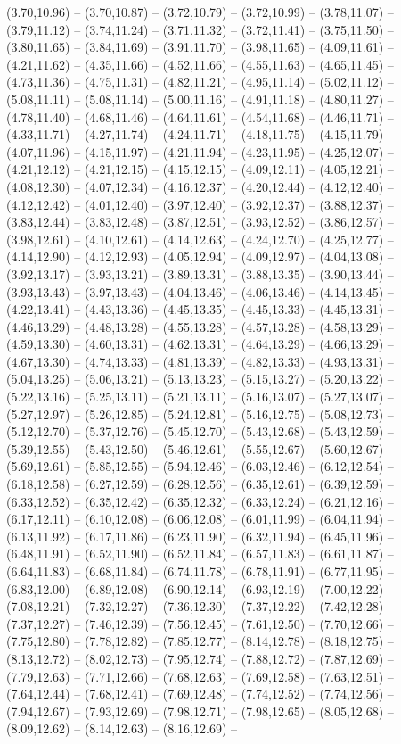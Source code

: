 {(3.70,10.96) -- (3.70,10.87) -- (3.72,10.79) -- (3.72,10.99) -- (3.78,11.07) -- (3.79,11.12) -- (3.74,11.24) -- (3.71,11.32) -- (3.72,11.41) -- (3.75,11.50) -- (3.80,11.65) -- (3.84,11.69) -- (3.91,11.70) -- (3.98,11.65) -- (4.09,11.61) -- (4.21,11.62) -- (4.35,11.66) -- (4.52,11.66) -- (4.55,11.63) -- (4.65,11.45) -- (4.73,11.36) -- (4.75,11.31) -- (4.82,11.21) -- (4.95,11.14) -- (5.02,11.12) -- (5.08,11.11) -- (5.08,11.14) -- (5.00,11.16) -- (4.91,11.18) -- (4.80,11.27) -- (4.78,11.40) -- (4.68,11.46) -- (4.64,11.61) -- (4.54,11.68) -- (4.46,11.71) -- (4.33,11.71) -- (4.27,11.74) -- (4.24,11.71) -- (4.18,11.75) -- (4.15,11.79) -- (4.07,11.96) -- (4.15,11.97) -- (4.21,11.94) -- (4.23,11.95) -- (4.25,12.07) -- (4.21,12.12) -- (4.21,12.15) -- (4.15,12.15) -- (4.09,12.11) -- (4.05,12.21) -- (4.08,12.30) -- (4.07,12.34) -- (4.16,12.37) -- (4.20,12.44) -- (4.12,12.40) -- (4.12,12.42) -- (4.01,12.40) -- (3.97,12.40) -- (3.92,12.37) -- (3.88,12.37) -- (3.83,12.44) -- (3.83,12.48) -- (3.87,12.51) -- (3.93,12.52) -- (3.86,12.57) -- (3.98,12.61) -- (4.10,12.61) -- (4.14,12.63) -- (4.24,12.70) -- (4.25,12.77) -- (4.14,12.90) -- (4.12,12.93) -- (4.05,12.94) -- (4.09,12.97) -- (4.04,13.08) -- (3.92,13.17) -- (3.93,13.21) -- (3.89,13.31) -- (3.88,13.35) -- (3.90,13.44) -- (3.93,13.43) -- (3.97,13.43) -- (4.04,13.46) -- (4.06,13.46) -- (4.14,13.45) -- (4.22,13.41) -- (4.43,13.36) -- (4.45,13.35) -- (4.45,13.33) -- (4.45,13.31) -- (4.46,13.29) -- (4.48,13.28) -- (4.55,13.28) -- (4.57,13.28) -- (4.58,13.29) -- (4.59,13.30) -- (4.60,13.31) -- (4.62,13.31) -- (4.64,13.29) -- (4.66,13.29) -- (4.67,13.30) -- (4.74,13.33) -- (4.81,13.39) -- (4.82,13.33) -- (4.93,13.31) -- (5.04,13.25) -- (5.06,13.21) -- (5.13,13.23) -- (5.15,13.27) -- (5.20,13.22) -- (5.22,13.16) -- (5.25,13.11) -- (5.21,13.11) -- (5.16,13.07) -- (5.27,13.07) -- (5.27,12.97) -- (5.26,12.85) -- (5.24,12.81) -- (5.16,12.75) -- (5.08,12.73) -- (5.12,12.70) -- (5.37,12.76) -- (5.45,12.70) -- (5.43,12.68) -- (5.43,12.59) -- (5.39,12.55) -- (5.43,12.50) -- (5.46,12.61) -- (5.55,12.67) -- (5.60,12.67) -- (5.69,12.61) -- (5.85,12.55) -- (5.94,12.46) -- (6.03,12.46) -- (6.12,12.54) -- (6.18,12.58) -- (6.27,12.59) -- (6.28,12.56) -- (6.35,12.61) -- (6.39,12.59) -- (6.33,12.52) -- (6.35,12.42) -- (6.35,12.32) -- (6.33,12.24) -- (6.21,12.16) -- (6.17,12.11) -- (6.10,12.08) -- (6.06,12.08) -- (6.01,11.99) -- (6.04,11.94) -- (6.13,11.92) -- (6.17,11.86) -- (6.23,11.90) -- (6.32,11.94) -- (6.45,11.96) -- (6.48,11.91) -- (6.52,11.90) -- (6.52,11.84) -- (6.57,11.83) -- (6.61,11.87) -- (6.64,11.83) -- (6.68,11.84) -- (6.74,11.78) -- (6.78,11.91) -- (6.77,11.95) -- (6.83,12.00) -- (6.89,12.08) -- (6.90,12.14) -- (6.93,12.19) -- (7.00,12.22) -- (7.08,12.21) -- (7.32,12.27) -- (7.36,12.30) -- (7.37,12.22) -- (7.42,12.28) -- (7.37,12.27) -- (7.46,12.39) -- (7.56,12.45) -- (7.61,12.50) -- (7.70,12.66) -- (7.75,12.80) -- (7.78,12.82) -- (7.85,12.77) -- (8.14,12.78) -- (8.18,12.75) -- (8.13,12.72) -- (8.02,12.73) -- (7.95,12.74) -- (7.88,12.72) -- (7.87,12.69) -- (7.79,12.63) -- (7.71,12.66) -- (7.68,12.63) -- (7.69,12.58) -- (7.63,12.51) -- (7.64,12.44) -- (7.68,12.41) -- (7.69,12.48) -- (7.74,12.52) -- (7.74,12.56) -- (7.94,12.67) -- (7.93,12.69) -- (7.98,12.71) -- (7.98,12.65) -- (8.05,12.68) -- (8.09,12.62) -- (8.14,12.63) -- (8.16,12.69) -- }
